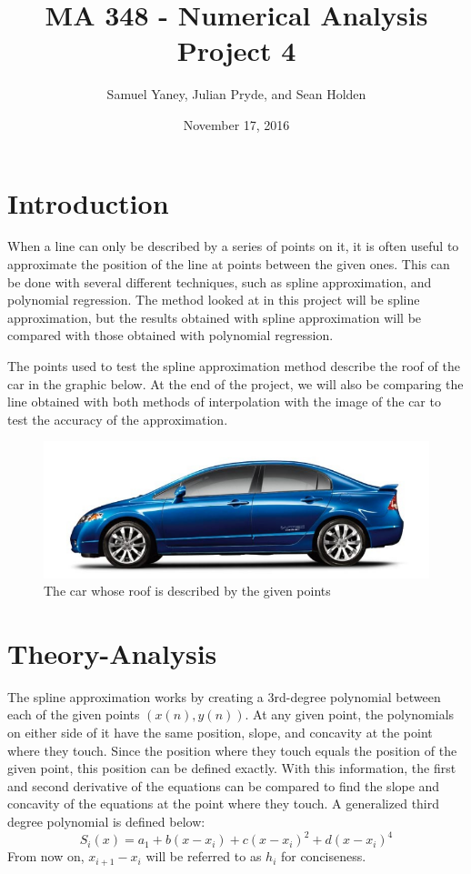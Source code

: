 \documentclass[12pt, letterpaper]{article} %
\begin{document}
\title{MA 348 - Numerical Analysis \\ Project 4}
\author{Samuel Yaney, Julian Pryde, and Sean Holden}
\date{November 17, 2016}
\maketitle

\section*{Introduction}


When a line can only be described by a series of points on it, it is often useful to approximate the position of the line at points between the given ones. This can be done with several different techniques, such as spline approximation, and polynomial regression. The method looked at in this project will be spline approximation, but the results obtained with spline approximation will be compared with those obtained with polynomial regression.

The points used to test the spline approximation method describe the roof of the car in the graphic below. At the end of the project, we will also be comparing the line obtained with both methods of interpolation with the image of the car to test the accuracy of the approximation.

\begin{center}
	\begin{figure}
		\includegraphics[scale=0.5]{Car.png}
		\caption{The car whose roof is described by the given points}
	\end{figure}
\end{center}

\section*{Theory-Analysis}
The spline approximation works by creating a 3rd-degree polynomial between each of the given points \((x(n), y(n))\). At any given point, the polynomials on either side of it have the same position, slope, and concavity at the point where they touch. Since the position where they touch equals the position of the given point, this position can be defined exactly. With this information, the first and second derivative of the equations can be compared to find the slope and concavity of the equations at the point where they touch. A generalized third degree polynomial is defined below:
\begin{equation}
S_i(x) = a_1 + b(x - x_i) + c(x - x_i)^2 + d(x - x_i)^4
\end{equation}
From now on, \(x_{i + 1} - x_i\) will be referred to as \(h_i\) for conciseness.
\end{document}
